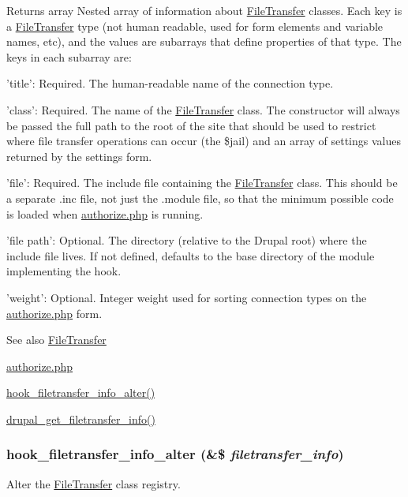 \begin{DoxyReturn}{Returns}
array Nested array of information about \hyperlink{classFileTransfer}{FileTransfer} classes. Each key is a \hyperlink{classFileTransfer}{FileTransfer} type (not human readable, used for form elements and variable names, etc), and the values are subarrays that define properties of that type. The keys in each subarray are:
\begin{DoxyItemize}
\item 'title': Required. The human-\/readable name of the connection type.
\item 'class': Required. The name of the \hyperlink{classFileTransfer}{FileTransfer} class. The constructor will always be passed the full path to the root of the site that should be used to restrict where file transfer operations can occur (the \$jail) and an array of settings values returned by the settings form.
\item 'file': Required. The include file containing the \hyperlink{classFileTransfer}{FileTransfer} class. This should be a separate .inc file, not just the .module file, so that the minimum possible code is loaded when \hyperlink{authorize_8php}{authorize.php} is running.
\item 'file path': Optional. The directory (relative to the Drupal root) where the include file lives. If not defined, defaults to the base directory of the module implementing the hook.
\item 'weight': Optional. Integer weight used for sorting connection types on the \hyperlink{authorize_8php}{authorize.php} form.
\end{DoxyItemize}
\end{DoxyReturn}
\begin{DoxySeeAlso}{See also}
\hyperlink{classFileTransfer}{FileTransfer} 

\hyperlink{authorize_8php}{authorize.php} 

\hyperlink{group__hooks_ga96aeda9756a48de73dacbf8bf1745266}{hook\_\-filetransfer\_\-info\_\-alter()} 

\hyperlink{common_8inc_a9530d4fd3eee97770ebaaa5103d24bf4}{drupal\_\-get\_\-filetransfer\_\-info()} 
\end{DoxySeeAlso}
\hypertarget{group__hooks_ga96aeda9756a48de73dacbf8bf1745266}{
\subsubsection[{hook\_\-filetransfer\_\-info\_\-alter}]{\setlength{\rightskip}{0pt plus 5cm}hook\_\-filetransfer\_\-info\_\-alter (\&\$ {\em filetransfer\_\-info})}}
\label{group__hooks_ga96aeda9756a48de73dacbf8bf1745266}
Alter the \hyperlink{classFileTransfer}{FileTransfer} class registry.


